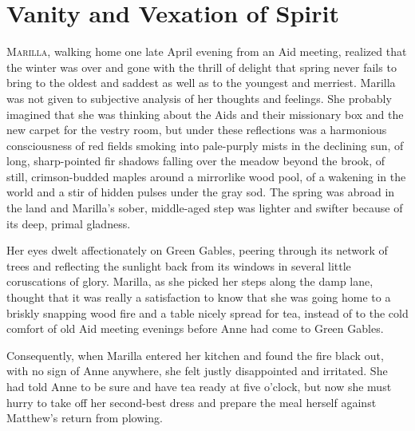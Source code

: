 \chapter{Vanity and Vexation of Spirit}

\lettrine{M}{arilla}, walking home one late April evening from an Aid meeting, realized that the winter was over and gone with the thrill of delight that spring never fails to bring to the oldest and saddest as well as to the youngest and merriest. Marilla was not given to subjective analysis of her thoughts and feelings. She probably imagined that she was thinking about the Aids and their missionary box and the new carpet for the vestry room, but under these reflections was a harmonious consciousness of red fields smoking into pale-purply mists in the declining sun, of long, sharp-pointed fir shadows falling over the meadow beyond the brook, of still, crimson-budded maples around a mirrorlike wood pool, of a wakening in the world and a stir of hidden pulses under the gray sod. The spring was abroad in the land and Marilla's sober, middle-aged step was lighter and swifter because of its deep, primal gladness.

Her eyes dwelt affectionately on Green Gables, peering through its network of trees and reflecting the sunlight back from its windows in several little coruscations of glory. Marilla, as she picked her steps along the damp lane, thought that it was really a satisfaction to know that she was going home to a briskly snapping wood fire and a table nicely spread for tea, instead of to the cold comfort of old Aid meeting evenings before Anne had come to Green Gables.

Consequently, when Marilla entered her kitchen and found the fire black out, with no sign of Anne anywhere, she felt justly disappointed and irritated. She had told Anne to be sure and have tea ready at five o'clock, but now she must hurry to take off her second-best dress and prepare the meal herself against Matthew's return from plowing.

